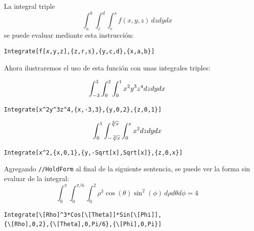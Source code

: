       La integral triple $$\int_a^b \int_c^d \int_e^s f(x,y,z)\, dzdydx$$
      se puede evaluar mediante esta instrucción:
      \begin{tcolorbox}[title=Integrales triples]
\begin{Verbatim}[formatcom=\letraverbatim]
Integrate[f[x,y,z],{z,r,s},{y,c,d},{x,a,b}]
\end{Verbatim}
      \end{tcolorbox}
      Ahora ilustraremos el uso de esta función con unas integrales triples:
      \begin{parrafonumerado}
      \item %
        $$\displaystyle \int_{-3}^3 \int_0^2 \int_0^1  x^2 y^3 z^4 dzdy dx$$ %
        \begin{tcolorbox}
\begin{Verbatim}[formatcom=\letraverbatim]
Integrate[x^2y^3z^4,{x,-3,3},{y,0,2},{z,0,1}]
\end{Verbatim}
        \end{tcolorbox}
      \item %
        $$\displaystyle \int_{0}^{1}\int_{-\sqrt[2]{x}}^{\sqrt[2]{x}}\int_{0}^{x}x^{2}dzdydx$$ %
        \begin{tcolorbox}
\begin{Verbatim}[formatcom=\letraverbatim]
Integrate[x^2,{x,0,1},{y,-Sqrt[x],Sqrt[x]},{z,0,x}]
\end{Verbatim}
        \end{tcolorbox}

      \item Agregando \verb"//HoldForm" al final de la siguiente sentencia, se puede ver la forma sin evaluar de la integral:
        $$\int_0^\pi\int_0^{\pi/6} \int_0^2 \rho^3 \cos(\theta)\sin^2(\phi)\, d\rho d \theta d\phi=4  $$
        \begin{tcolorbox}
\begin{Verbatim}[formatcom=\letraverbatim]
Integrate[\[Rho]^3*Cos[\[Theta]]*Sin[\[Phi]],
{\[Rho],0,2},{\[Theta],0,Pi/6},{\[Phi],0,Pi}]
\end{Verbatim}
        \end{tcolorbox}


\end{parrafonumerado}

